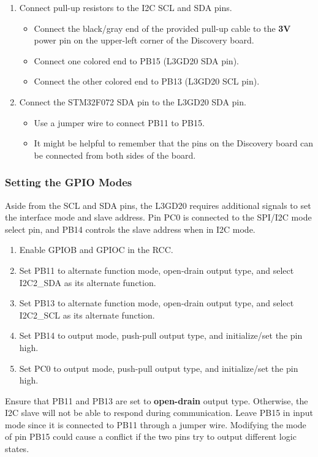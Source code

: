 \documentclass[11pt,fleqn]{book} %
\begin{document}
\begin{enumerate}
    \item Connect pull-up resistors to the I2C SCL and SDA pins. 
    \begin{itemize}
        \item Connect the black/gray end of the provided pull-up cable to the \textbf{3V} power pin on the upper-left corner of the Discovery board.
        \item Connect one colored end to PB15 (L3GD20 SDA pin).
        \item Connect the other colored end to PB13 (L3GD20 SCL pin).
    \end{itemize}
    \item Connect the STM32F072 SDA pin to the L3GD20 SDA pin.
    \begin{itemize}
        \item Use a jumper wire to connect PB11 to PB15.
        \item It might be helpful to remember that the pins on the Discovery board can be connected from both sides of the board. 
    \end{itemize}
\end{enumerate}

\subsubsection{Setting the GPIO Modes}
Aside from the SCL and SDA pins, the L3GD20 requires additional signals to set the interface mode and slave address. Pin PC0 is connected to the SPI/I2C mode select pin, and PB14 controls the slave address when in I2C mode. 

\begin{enumerate}
    \item Enable GPIOB and GPIOC in the RCC. 
    \item Set PB11 to alternate function mode, open-drain output type, and select I2C2\_SDA as its alternate function.
    \item Set PB13 to alternate function mode, open-drain output type, and select I2C2\_SCL as its alternate function.
    \item Set PB14 to output mode, push-pull output type, and initialize/set the pin high.
    \item Set PC0 to output mode, push-pull output type, and initialize/set the pin high.
\end{enumerate}

\begin{warning}
    Ensure that PB11 and PB13 are set to \textbf{open-drain} output type. Otherwise, the I2C slave will not be able to respond during communication. Leave PB15 in input mode since it is connected to PB11 through a jumper wire. Modifying the mode of pin PB15 could cause a conflict if the two pins try to output different logic states. 
\end{warning}
\end{document}
